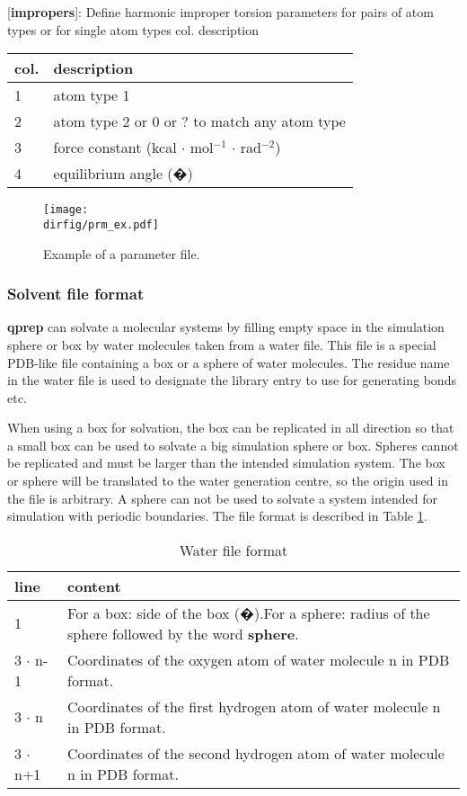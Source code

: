 \documentclass[a4paper,10pt]{article}
\newcommand{\dirfig}{./pictures}
\begin{document}
[\textbf{impropers}]: Define harmonic improper torsion parameters
for pairs of atom types or for single atom types col. description \\
\begin{tabularx}{\textwidth}{|l|X|}
\hline \bf{col.} & \bf{description} \\
\hline 1 & atom type 1 \\
\hline 2 & atom type 2 or 0 or ? to match any atom type \\
\hline 3 & force constant (kcal $\cdot$ mol$^{-1}$ $\cdot$ rad$^{-2}$) \\
\hline 4 & equilibrium angle (�)\\
\hline
\end{tabularx}
\normalsize

\begin{figure}[h]
\begin{center}
\texttt{[image: \\dirfig/prm\_ex.pdf]}
\caption{Example of a parameter file.} \label{fig:prm_ex}
\end{center}
\end{figure}

\subsubsection{Solvent file format}
\label{subsubsec:solvent_file_format} \textbf{qprep} can solvate a
molecular systems by  filling empty space in the  simulation sphere or
box by water molecules taken from a water file. This file is a special
PDB-like file  containing a box  or a  sphere of water  molecules. The
residue name in the water file  is used to designate the library entry
to use for generating bonds etc.

When  using a  box for  solvation, the  box can  be replicated  in all
direction so that a small box can  be used to solvate a big simulation
sphere or  box. Spheres cannot be  replicated and must be  larger than
the intended simulation  system. The box or sphere  will be translated
to the  water generation  centre, so  the origin used  in the  file is
arbitrary. A sphere  can not be used to solvate  a system intended for
simulation with periodic  boundaries. The file format  is described in
Table \ref{tab:wat_file}.


\begin{table}[h]
\caption{Water file format} \label{tab:wat_file}
\begin{tabularx}{\textwidth}{|l|X|}
\hline \bf{line} & \bf{content}\\
\hline 1 & For a box: side of the box (�).For a sphere: radius of
the sphere followed by the word \textbf{sphere}. \\
\hline 3 $\cdot$ n-1 & Coordinates of the oxygen atom of water
molecule n in PDB format. \\
\hline 3 $\cdot$ n & Coordinates of the first hydrogen atom of
water molecule n in PDB format. \\
\hline 3 $\cdot$ n+1 & Coordinates of the second hydrogen atom of
water molecule n in PDB format. \\
\hline
\end{tabularx}
\end{table}
\end{document}

